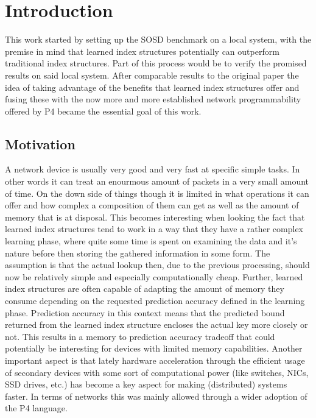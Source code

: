 
\chapter{Introduction}
\label{ch:introduction}
This work started by setting up the SOSD benchmark \cite{sosd-neurips} on a local system, with the premise in mind that learned index structures potentially can outperform traditional index structures. Part of this process would be to verify the promised results on said local system. After comparable results to the original paper \cite{sosd-neurips} the idea of taking advantage of the benefits that learned index structures offer and fusing these with the now more and more established network programmability offered by P4 became the essential goal of this work.

\section{Motivation}
A network device is usually very good and very fast at specific simple tasks. In other words it can treat an enourmous amount of packets in a very small amount of time. On the down side of things though it is limited in what operations it can offer and how complex a composition of them can get as well as the amount of memory that is at disposal. This becomes interesting when looking the fact that learned index structures tend to work in a way that they have a rather complex learning phase, where quite some time is spent on examining the data and it's nature before then storing the gathered information in some form. The assumption is that the actual lookup then, due to the previous processing, should now be relatively simple and especially computationally cheap. Further, learned index structures are often capable of adapting the amount of memory they consume depending on the requested prediction accuracy defined in the learning phase. Prediction accuracy in this context means that the predicted bound returned from the learned index structure encloses the actual key more closely or not. This results in a memory to prediction accuracy tradeoff that could potentially be interesting for devices with limited memory capabilities. Another important aspect is that lately hardware acceleration through the efficient usage of secondary devices with some sort of computational power (like switches, NICs, SSD drives, etc.) has become a key aspect for making (distributed) systems faster. In terms of networks this was mainly allowed through a wider adoption of the P4 language.\\

